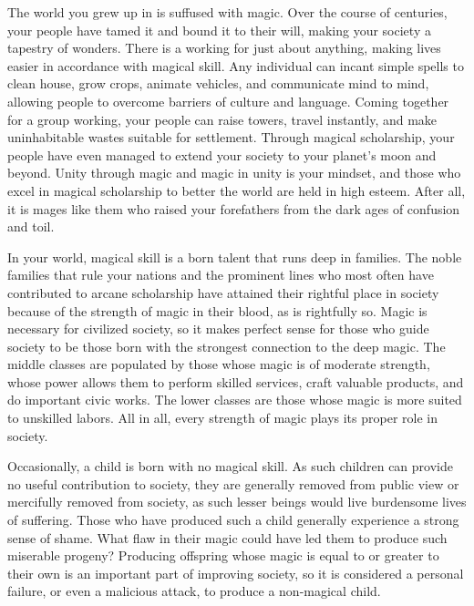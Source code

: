 \documentclass[blue]{guildcamp3}
\begin{document}
\name{\bMagicWorld{}}

The world you grew up in is suffused with magic. Over the course of centuries, your people have tamed it and bound it to their will, making your society a tapestry of wonders. There is a working for just about anything, making lives easier in accordance with magical skill. Any individual can incant simple spells to clean house, grow crops, animate vehicles, and communicate mind to mind, allowing people to overcome barriers of culture and language. Coming together for a group working, your people can raise towers, travel instantly, and make uninhabitable wastes suitable for settlement. Through magical scholarship, your people have even managed to extend your society to your planet's moon and beyond. Unity through magic and magic in unity is your mindset, and those who excel in magical scholarship to better the world are held in high esteem. After all, it is mages like them who raised your forefathers from the dark ages of confusion and toil.

In your world, magical skill is a born talent that runs deep in families. The noble families that rule your nations and the prominent lines who most often have contributed to arcane scholarship have attained their rightful place in society because of the strength of magic in their blood, as is rightfully so. Magic is necessary for civilized society, so it makes perfect sense for those who guide society to be those born with the strongest connection to the deep magic. The middle classes are populated by those whose magic is of moderate strength, whose power allows them to perform skilled services, craft valuable products, and do important civic works. The lower classes are those whose magic is more suited to unskilled labors. All in all, every strength of magic plays its proper role in society.

Occasionally, a child is born with no magical skill. As such children can provide no useful contribution to society, they are generally removed from public view or mercifully removed from society, as such lesser beings would live burdensome lives of suffering. Those who have produced such a child generally experience a strong sense of shame. What flaw in their magic could have led them to produce such miserable progeny? Producing offspring whose magic is equal to or greater to their own is an important part of improving society, so it is considered a personal failure, or even a malicious attack, to produce a non-magical child.
\end{document}
